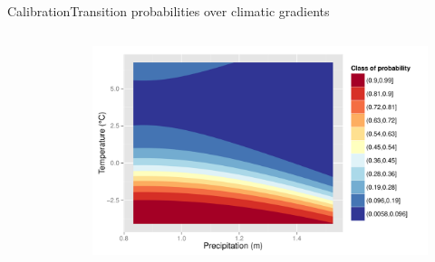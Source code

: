 \documentclass[10pt,aspectratio=149]{beamer}
\begin{document}

\begin{frame}{Calibration}{Transition probabilities over climatic gradients}

	  \begin{columns}[t]
        \begin{column}{0.15\linewidth}
        \vspace{-4em}
        \begin{figure}
			\small{}
		\end{figure}
        \end{column}
		\hspace{1em}
        \begin{column}{0.82\linewidth}
            \begin{figure}
	          \includegraphics[width=1\linewidth]{Figs/dist.pdf}
	        \end{figure}
        \end{column}

      \end{columns}
	
\end{frame}

\end{document}

